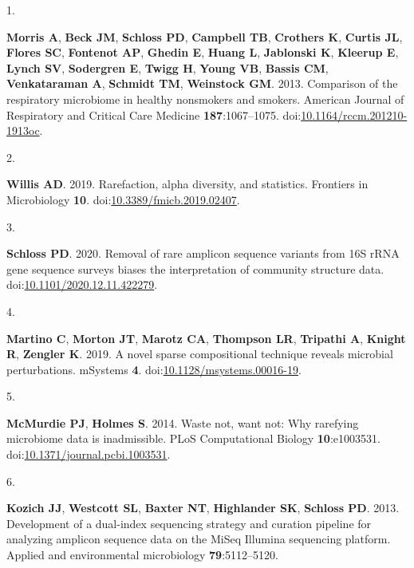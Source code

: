\documentclass[
]{article}
\newlength{\cslhangindent}
\newlength{\csllabelwidth}
\newlength{\cslentryspacingunit} %
\newenvironment{CSLReferences}[2] %
 {%
  \setlength{\parindent}{0pt}
  \ifodd #1
  \let\oldpar\par
  \def\par{\hangindent=\cslhangindent\oldpar}
  \fi
  \setlength{\parskip}{#2\cslentryspacingunit}
 }%
 {}
\newcommand{\CSLLeftMargin}[1]{\parbox[t]{\csllabelwidth}{#1}}
\newcommand{\CSLRightInline}[1]{\parbox[t]{\linewidth - \csllabelwidth}{#1}\break}
\begin{document}
\hypertarget{refs}{}
\begin{CSLReferences}{0}{1}
\leavevmode{}%
\CSLLeftMargin{1. }%
\CSLRightInline{\textbf{Morris A}, \textbf{Beck JM}, \textbf{Schloss
PD}, \textbf{Campbell TB}, \textbf{Crothers K}, \textbf{Curtis JL},
\textbf{Flores SC}, \textbf{Fontenot AP}, \textbf{Ghedin E},
\textbf{Huang L}, \textbf{Jablonski K}, \textbf{Kleerup E},
\textbf{Lynch SV}, \textbf{Sodergren E}, \textbf{Twigg H}, \textbf{Young
VB}, \textbf{Bassis CM}, \textbf{Venkataraman A}, \textbf{Schmidt TM},
\textbf{Weinstock GM}. 2013. Comparison of the respiratory microbiome in
healthy nonsmokers and smokers. American Journal of Respiratory and
Critical Care Medicine \textbf{187}:1067--1075.
doi:\href{https://doi.org/10.1164/rccm.201210-1913oc}{10.1164/rccm.201210-1913oc}.}

\leavevmode{}%
\CSLLeftMargin{2. }%
\CSLRightInline{\textbf{Willis AD}. 2019. Rarefaction, alpha diversity,
and statistics. Frontiers in Microbiology \textbf{10}.
doi:\href{https://doi.org/10.3389/fmicb.2019.02407}{10.3389/fmicb.2019.02407}.}

\leavevmode{}%
\CSLLeftMargin{3. }%
\CSLRightInline{\textbf{Schloss PD}. 2020. Removal of rare amplicon
sequence variants from 16S {rRNA} gene sequence surveys biases the
interpretation of community structure data.
doi:\href{https://doi.org/10.1101/2020.12.11.422279}{10.1101/2020.12.11.422279}.}

\leavevmode{}%
\CSLLeftMargin{4. }%
\CSLRightInline{\textbf{Martino C}, \textbf{Morton JT}, \textbf{Marotz
CA}, \textbf{Thompson LR}, \textbf{Tripathi A}, \textbf{Knight R},
\textbf{Zengler K}. 2019. A novel sparse compositional technique reveals
microbial perturbations. {mSystems} \textbf{4}.
doi:\href{https://doi.org/10.1128/msystems.00016-19}{10.1128/msystems.00016-19}.}

\leavevmode{}%
\CSLLeftMargin{5. }%
\CSLRightInline{\textbf{McMurdie PJ}, \textbf{Holmes S}. 2014. Waste
not, want not: Why rarefying microbiome data is inadmissible. {PLoS}
Computational Biology \textbf{10}:e1003531.
doi:\href{https://doi.org/10.1371/journal.pcbi.1003531}{10.1371/journal.pcbi.1003531}.}

\leavevmode{}%
\CSLLeftMargin{6. }%
\CSLRightInline{\textbf{Kozich JJ}, \textbf{Westcott SL}, \textbf{Baxter
NT}, \textbf{Highlander SK}, \textbf{Schloss PD}. 2013. {Development of
a dual-index sequencing strategy and curation pipeline for analyzing
amplicon sequence data on the MiSeq Illumina sequencing platform}.
Applied and environmental microbiology \textbf{79}:5112--5120.}


\end{CSLReferences}
\end{document}
